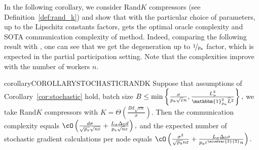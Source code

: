 \documentclass{article}
\newcommand{\algorithmname}{DASHA-PP}
\newcommand*{\probavailable}{\ensuremath{p_{\textnormal{a}}}}
\begin{document}

In the following corollary, we consider Rand$K$ compressors (see Definition~\ref{def:rand_k}) and show that with the particular choice of parameters, up to the Lipschitz constants factors, \algname{\algorithmname-MVR} gets the optimal oracle complexity and SOTA communication complexity of  method. Indeed, comparing the following result with \citep[Corollary 6.9]{tyurin2022dasha}, one can see that we get the degeneration up to $\nicefrac{1}{\probavailable}$ factor, which is expected in the partial participation setting. Note that the complexities improve with the number of workers $n.$

\begin{restatable}{corollary}{COROLLARYSTOCHASTICRANDK}
  \label{cor:stochastic:randk}
  Suppose that assumptions of Corollary~\ref{cor:stochastic} hold, batch size $B \leq \min\left\{\frac{\sigma}{\probavailable\sqrt{\varepsilon} n}, \frac{L_{\sigma}^2}{\mathbbm{1}_{\probavailable}^2 \widehat{L}^2}\right\},$ we take Rand$K$ compressors with $K = \Theta\left(\frac{B d \sqrt{\varepsilon n}}{\sigma}\right).$ Then
  the communication complexity equals 
  $
      \cO\left(\frac{d \sigma}{\sqrt{\probavailable} \sqrt{n \varepsilon}} + \frac{L_{\sigma} \Delta_0 d}{\probavailable \sqrt{n} \varepsilon}\right),
  $
  and the expected number of stochastic gradient calculations per node equals
  $
      \cO\left(\frac{\sigma^2}{\sqrt{\probavailable} n \varepsilon} + \frac{L_{\sigma} \Delta_0 \sigma}{\probavailable \varepsilon^{\nicefrac{3}{2}} n}\right).
  $
\end{restatable}
\end{document}

